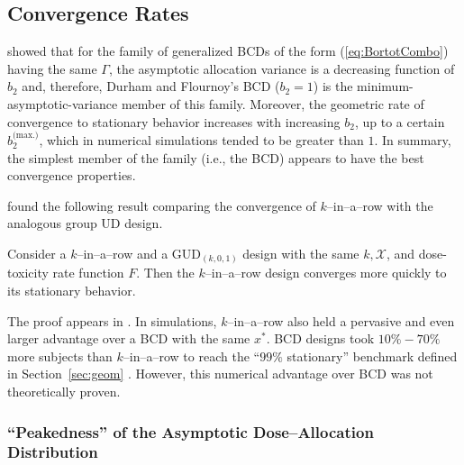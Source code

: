 \subsection{Convergence Rates}

\cite{Bort:Giov:Upan:2005} showed that for the family of generalized BCDs of the form (\ref{eq:BortotCombo}) having the same $\Gamma$, the asymptotic allocation variance is a decreasing function of $b_2$ and, therefore, Durham and Flournoy's BCD ($b_2=1$) is the minimum-asymptotic-variance member of this family. Moreover, the geometric rate of convergence to stationary behavior increases with increasing $b_2$, up to a certain $b_2^\textrm{(max.)}$, which in numerical simulations tended to be greater than $1$. In summary, the simplest member of the family (i.e., the BCD) appears to have the best convergence properties.

\cite{Oron:Hoff:thek:2009} found the following result comparing the convergence of $k$--in--a--row with the analogous group UD design.
%
\begin{thm}\label{thm:krgudconv} Consider a $k$--in--a--row and a GUD$_{(k,0,1)}$ design with the same $k,\mathcal{X}$, and dose-toxicity rate function $F$. Then the $k$--in--a--row design converges more quickly to its stationary behavior.\end{thm}
%
\noindent The proof appears in \cite{Oron:Hoff:thek:2009}. In simulations, $k$--in--a--row also held a pervasive and even larger advantage over a BCD with the same $x^*$. BCD designs took $10\%-70\%$ more subjects than $k$--in--a--row to reach the ``$99\%$ stationary'' benchmark defined in Section~\ref{sec:geom} \citep{Oron:Hoff:thek:2009}. However, this numerical advantage over BCD was not theoretically proven.

\subsubsection{``Peakedness'' of the Asymptotic Dose--Allocation Distribution}

